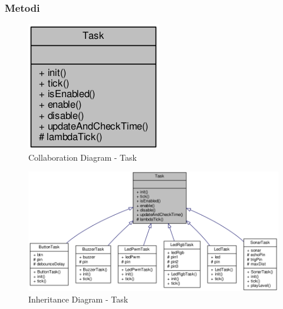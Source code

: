\subsubsection{Metodi}
\begin{figure}[!ht]
	\centering
	\includegraphics[scale=.5]{img/UML/CollaborationDiagram/Task.png}
	\caption{Collaboration Diagram - Task}
\end{figure}
\begin{figure}[!ht]
	\centering
	\includegraphics[scale=.35]{img/UML/InheritanceDiagram/Task.png}
	\caption{Inheritance Diagram - Task}
\end{figure}
